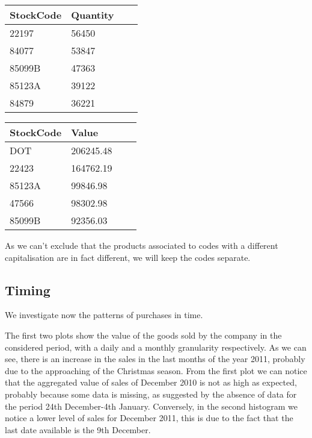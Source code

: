 \documentclass[12pt,a4paper,oneside,italian]{book}\usepackage{knitr}
\begin{document}
\begin{table}[!htb]
    \begin{minipage}{.5\linewidth}
      \centering \begin{table}[H]
\centering
\begin{tabular}{llrr}
\toprule
StockCode & Quantity\\
\midrule
22197 & 56450\\
84077 & 53847\\
85099B & 47363\\
85123A & 39122\\
84879 & 36221\\
\bottomrule
\end{tabular}
\end{table} \end{minipage}%
    \begin{minipage}{.5\linewidth}
      \centering \begin{table}[H]
\centering
\begin{tabular}{llrr}
\toprule
StockCode & Value\\
\midrule
DOT & 206245.48\\
22423 & 164762.19\\
85123A & 99846.98\\
47566 & 98302.98\\
85099B & 92356.03\\
\bottomrule
\end{tabular}
\end{table} \end{minipage}
\end{table}

As we can't exclude that the products associated to codes with a different capitalisation are in fact different, we will keep the codes separate.





\subsection*{Timing}

We investigate now the patterns of purchases in time.

The first two plots show the value of the goods sold by the company in the considered period, with a daily and a monthly granularity respectively. As we can see, there is an increase in the sales in the last months of the year 2011, probably due to the approaching of the Christmas season.
From the first plot we can notice that the aggregated value of sales of December 2010 is not as high as expected, probably because some data is missing, as suggested by the absence of data for the period 24th December-4th January.
Conversely, in the second histogram we notice a lower level of sales for December 2011, this is due to the fact that the last date available is the 9th December.
\\
\end{document}

